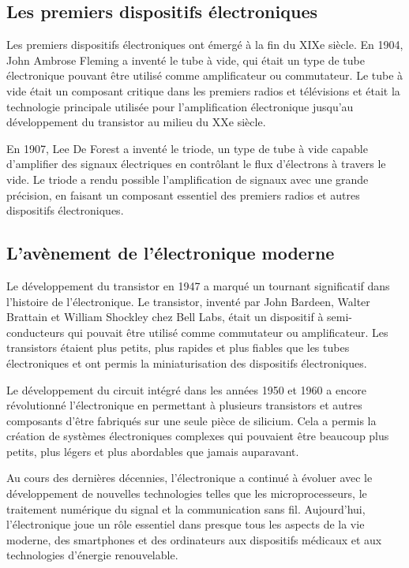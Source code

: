 \subsection{Les premiers dispositifs électroniques}

Les premiers dispositifs électroniques ont émergé à la fin du XIXe siècle. En 1904, John Ambrose Fleming a inventé le tube à vide, qui était un type de tube électronique pouvant être utilisé comme amplificateur ou commutateur. Le tube à vide était un composant critique dans les premiers radios et télévisions et était la technologie principale utilisée pour l'amplification électronique jusqu'au développement du transistor au milieu du XXe siècle.

En 1907, Lee De Forest a inventé le triode, un type de tube à vide capable d'amplifier des signaux électriques en contrôlant le flux d'électrons à travers le vide. Le triode a rendu possible l'amplification de signaux avec une grande précision, en faisant un composant essentiel des premiers radios et autres dispositifs électroniques.

\subsection{L'avènement de l'électronique moderne}

Le développement du transistor en 1947 a marqué un tournant significatif dans l'histoire de l'électronique. Le transistor, inventé par John Bardeen, Walter Brattain et William Shockley chez Bell Labs, était un dispositif à semi-conducteurs qui pouvait être utilisé comme commutateur ou amplificateur. Les transistors étaient plus petits, plus rapides et plus fiables que les tubes électroniques et ont permis la miniaturisation des dispositifs électroniques.

Le développement du circuit intégré dans les années 1950 et 1960 a encore révolutionné l'électronique en permettant à plusieurs transistors et autres composants d'être fabriqués sur une seule pièce de silicium. Cela a permis la création de systèmes électroniques complexes qui pouvaient être beaucoup plus petits, plus légers et plus abordables que jamais auparavant.

Au cours des dernières décennies, l'électronique a continué à évoluer avec le développement de nouvelles technologies telles que les microprocesseurs, le traitement numérique du signal et la communication sans fil. Aujourd'hui, l'électronique joue un rôle essentiel dans presque tous les aspects de la vie moderne, des smartphones et des ordinateurs aux dispositifs médicaux et aux technologies d'énergie renouvelable.
